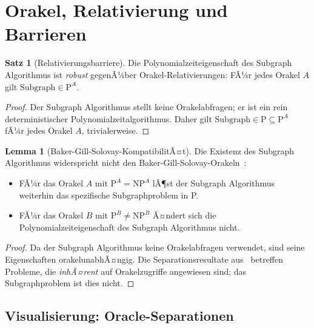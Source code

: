 ﻿\documentclass[a4paper,12pt]{article}
\theoremstyle{definition}
\newtheorem{satz}{Satz}
\newtheorem{lemma}{Lemma}
\begin{document}
\section{Orakel, Relativierung und Barrieren}
\label{sec:oracle}

\begin{satz}[Relativierungsbarriere]
\label{satz:oracle}
  Die Polynomialzeiteigenschaft des Subgraph Algorithmus ist \emph{robust}
  gegenÃ¼ber Orakel-Relativierungen: FÃ¼r jedes Orakel $A$ gilt
  $\mathrm{Subgraph} \in \mathrm{P}^A$.
\end{satz}

\begin{proof}
  Der Subgraph Algorithmus stellt keine Orakelabfragen; er ist ein rein
  deterministischer Polynomialzeitalgorithmus.
  Daher gilt $\mathrm{Subgraph} \in \mathrm{P} \subseteq \mathrm{P}^A$
  fÃ¼r jedes Orakel $A$, trivialerweise.
\end{proof}

\begin{lemma}[Baker-Gill-Solovay-KompatibilitÃ¤t]
  Die Existenz des Subgraph Algorithmus widerspricht nicht den
  Baker-Gill-Solovay-Orakeln~\cite{baker1975relativizations}:
  \begin{itemize}
    \item FÃ¼r das Orakel $A$ mit $\mathrm{P}^A = \mathrm{NP}^A$ lÃ¶st der
          Subgraph Algorithmus weiterhin das spezifische Subgraphproblem in P.
    \item FÃ¼r das Orakel $B$ mit $\mathrm{P}^B \neq \mathrm{NP}^B$ Ã¤ndert
          sich die Polynomialzeiteigenschaft des Subgraph Algorithmus nicht.
  \end{itemize}
\end{lemma}

\begin{proof}
  Da der Subgraph Algorithmus keine Orakelabfragen verwendet, sind seine
  Eigenschaften orakelunabhÃ¤ngig. Die Separationsresultate aus~\cite{baker1975relativizations}
  betreffen Probleme, die \emph{inhÃ¤rent} auf Orakelzugriffe angewiesen sind;
  das Subgraphproblem ist dies nicht.
\end{proof}

\subsection{Visualisierung: Oracle-Separationen}
\label{sec:plot5}
\end{document}

